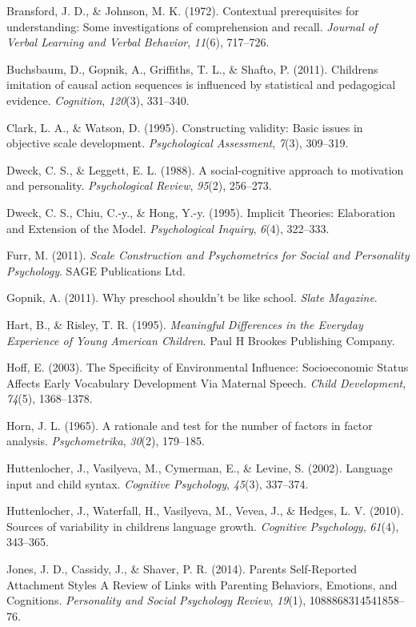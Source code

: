 \documentclass[10pt, letterpaper]{article}
\begin{document}
Bransford, J. D., \& Johnson, M. K. (1972). Contextual prerequisites for
understanding: Some investigations of comprehension and recall.
\emph{Journal of Verbal Learning and Verbal Behavior}, \emph{11}(6),
717--726.

Buchsbaum, D., Gopnik, A., Griffiths, T. L., \& Shafto, P. (2011).
Childrens imitation of causal action sequences is influenced by
statistical and pedagogical evidence. \emph{Cognition}, \emph{120}(3),
331--340.

Clark, L. A., \& Watson, D. (1995). Constructing validity: Basic issues
in objective scale development. \emph{Psychological Assessment},
\emph{7}(3), 309--319.

Dweck, C. S., \& Leggett, E. L. (1988). A social-cognitive approach to
motivation and personality. \emph{Psychological Review}, \emph{95}(2),
256--273.

Dweck, C. S., Chiu, C.-y., \& Hong, Y.-y. (1995). Implicit Theories:
Elaboration and Extension of the Model. \emph{Psychological Inquiry},
\emph{6}(4), 322--333.

Furr, M. (2011). \emph{Scale Construction and Psychometrics for Social
and Personality Psychology}. SAGE Publications Ltd.

Gopnik, A. (2011). Why preschool shouldn't be like school. \emph{Slate
Magazine}.

Hart, B., \& Risley, T. R. (1995). \emph{Meaningful Differences in the
Everyday Experience of Young American Children}. Paul H Brookes
Publishing Company.

Hoff, E. (2003). The Specificity of Environmental Influence:
Socioeconomic Status Affects Early Vocabulary Development Via Maternal
Speech. \emph{Child Development}, \emph{74}(5), 1368--1378.

Horn, J. L. (1965). A rationale and test for the number of factors in
factor analysis. \emph{Psychometrika}, \emph{30}(2), 179--185.

Huttenlocher, J., Vasilyeva, M., Cymerman, E., \& Levine, S. (2002).
Language input and child syntax. \emph{Cognitive Psychology},
\emph{45}(3), 337--374.

Huttenlocher, J., Waterfall, H., Vasilyeva, M., Vevea, J., \& Hedges, L.
V. (2010). Sources of variability in childrens language growth.
\emph{Cognitive Psychology}, \emph{61}(4), 343--365.

Jones, J. D., Cassidy, J., \& Shaver, P. R. (2014). Parents
Self-Reported Attachment Styles A Review of Links with Parenting
Behaviors, Emotions, and Cognitions. \emph{Personality and Social
Psychology Review}, \emph{19}(1), 1088868314541858--76.
\end{document}
